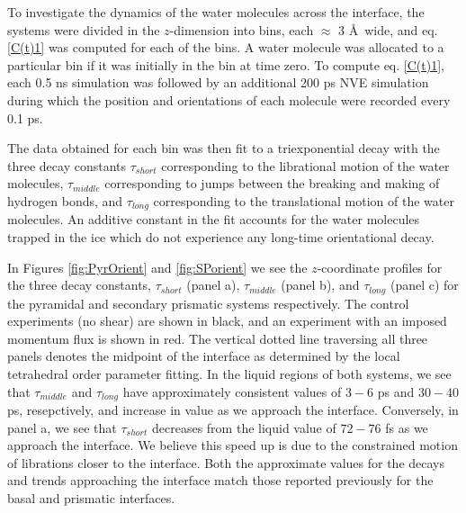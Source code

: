 \documentclass{pnastwo}
\begin{document}
\begin{article}
To investigate the dynamics of the water molecules across the interface, the 
systems were divided in the $z$-dimension into bins, each $\approx$ 3 \AA\
 wide, and eq. \eqref{C(t)1} was computed for each of the bins. A water 
molecule was allocated to a particular bin if it was initially in the bin
at time zero. To compute eq. \eqref{C(t)1}, each 0.5 ns simulation was 
followed by an additional 200 ps NVE simulation during which the 
position and orientations of each molecule were recorded every 0.1 ps.
 
The data obtained for each bin was then fit to a triexponential decay
with the three decay constants
$\tau_{short}$ corresponding to the librational motion of the water  
molecules, $\tau_{middle}$ corresponding to jumps between the breaking and 
making of hydrogen bonds, and $\tau_{long}$ corresponding to the translational
motion of the water molecules. An additive constant in the fit accounts
for the water molecules trapped in the ice which do not experience any
long-time orientational decay.

In Figures \ref{fig:PyrOrient} and \ref{fig:SPorient} we see the $z$-coordinate
profiles for the three decay constants, $\tau_{short}$ (panel a), 
$\tau_{middle}$ (panel b),
and $\tau_{long}$ (panel c) for the pyramidal and secondary prismatic systems
respectively. The control experiments (no shear) are shown in black, and 
an experiment with an imposed momentum flux is shown in red. The vertical
dotted line traversing all three panels denotes the midpoint of the 
interface as determined by the local tetrahedral order parameter fitting.
In the liquid regions of both systems, we see that $\tau_{middle}$ and
$\tau_{long}$ have approximately consistent values of $3-6$ ps and $30-40$ ps,
resepctively, and increase in value as we approach the interface. Conversely,
in panel a, we see that $\tau_{short}$ decreases from the liquid value 
of $72-76$ fs as we approach the interface. We believe this speed up is due to
the constrained motion of librations closer to the interface. Both the 
approximate values for the decays and trends approaching the interface  match 
those reported previously for the basal and prismatic interfaces.


\end{article}
\end{document}
